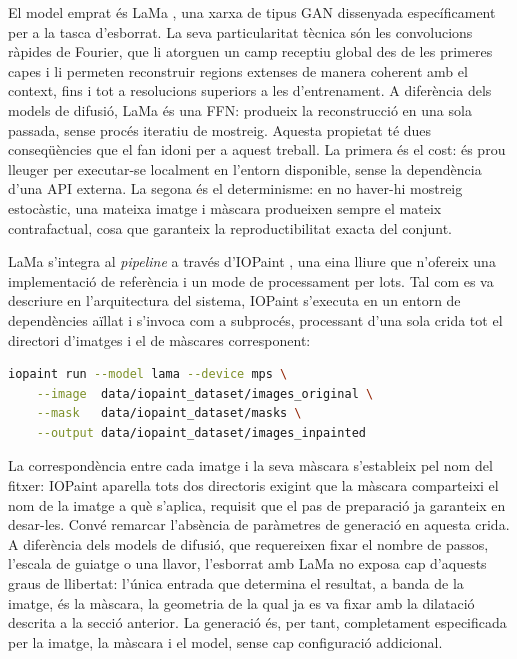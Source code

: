 El model emprat és LaMa \cite{Suvorov2021}, una xarxa de tipus \ac{GAN} dissenyada específicament per a la tasca d'esborrat. La seva particularitat tècnica són les convolucions ràpides de Fourier, que li atorguen un camp receptiu global des de les primeres capes i li permeten reconstruir regions extenses de manera coherent amb el context, fins i tot a resolucions superiors a les d'entrenament. A diferència dels models de difusió, LaMa és una \ac{FFN}: produeix la reconstrucció en una sola passada, sense procés iteratiu de mostreig. Aquesta propietat té dues conseqüències que el fan idoni per a aquest treball. La primera és el cost: és prou lleuger per executar-se localment en l'entorn disponible, sense la dependència d'una \ac{API} externa. La segona és el determinisme: en no haver-hi mostreig estocàstic, una mateixa imatge i màscara produeixen sempre el mateix contrafactual, cosa que garanteix la reproductibilitat exacta del conjunt.

LaMa s'integra al \emph{pipeline} a través d'IOPaint \cite{iopaint}, una eina lliure que n'ofereix una implementació de referència i un mode de processament per lots. Tal com es va descriure en l'arquitectura del sistema, IOPaint s'executa en un entorn de dependències aïllat i s'invoca com a subprocés, processant d'una sola crida tot el directori d'imatges i el de màscares corresponent:

\begin{lstlisting}[language=bash, caption={Invocació d'IOPaint en mode per lots amb LaMa.}, label={lst:iopaint}]
iopaint run --model lama --device mps \
    --image  data/iopaint_dataset/images_original \
    --mask   data/iopaint_dataset/masks \
    --output data/iopaint_dataset/images_inpainted
\end{lstlisting}

La correspondència entre cada imatge i la seva màscara s'estableix pel nom del fitxer: IOPaint aparella tots dos directoris exigint que la màscara comparteixi el nom de la imatge a què s'aplica, requisit que el pas de preparació ja garanteix en desar-les. Convé remarcar l'absència de paràmetres de generació en aquesta crida. A diferència dels models de difusió, que requereixen fixar el nombre de passos, l'escala de guiatge o una llavor, l'esborrat amb LaMa no exposa cap d'aquests graus de llibertat: l'única entrada que determina el resultat, a banda de la imatge, és la màscara, la geometria de la qual ja es va fixar amb la dilatació descrita a la secció anterior. La generació és, per tant, completament especificada per la imatge, la màscara i el model, sense cap configuració addicional.

